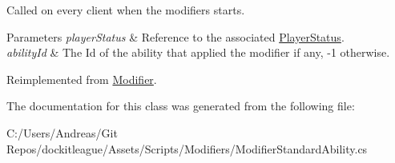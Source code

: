 Called on every client when the modifiers starts. 


\begin{DoxyParams}{Parameters}
{\em player\+Status} & Reference to the associated \hyperlink{class_player_status}{Player\+Status}.\\
\hline
{\em ability\+Id} & The Id of the ability that applied the modifier if any, -\/1 otherwise.\\
\hline
\end{DoxyParams}


Reimplemented from \hyperlink{class_modifier_a90f173bd4674843a683769f46520273b}{Modifier}.



The documentation for this class was generated from the following file\+:\begin{DoxyCompactItemize}
\item 
C\+:/\+Users/\+Andreas/\+Git Repos/dockitleague/\+Assets/\+Scripts/\+Modifiers/Modifier\+Standard\+Ability.\+cs\end{DoxyCompactItemize}
